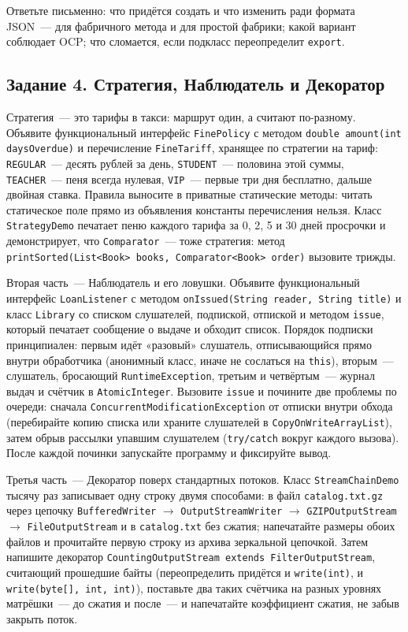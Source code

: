 Ответьте письменно: что придётся создать и что изменить ради формата JSON~---
для фабричного метода и для простой фабрики; какой вариант соблюдает OCP; что
сломается, если подкласс переопределит \texttt{export}.

\subsection*{Задание 4. Стратегия, Наблюдатель и Декоратор}

Стратегия~--- это тарифы в такси: маршрут один, а считают по-разному. Объявите
функциональный интерфейс \texttt{FinePolicy} с методом
\texttt{double amount(int daysOverdue)} и перечисление \texttt{FineTariff},
хранящее по стратегии на тариф: \texttt{REGULAR}~--- десять рублей за день,
\texttt{STUDENT}~--- половина этой суммы, \texttt{TEACHER}~--- пеня всегда
нулевая, \texttt{VIP}~--- первые три дня бесплатно, дальше двойная ставка.
Правила выносите в приватные статические методы: читать статическое поле прямо
из объявления константы перечисления нельзя. Класс \texttt{StrategyDemo} печатает
пеню каждого тарифа за 0, 2, 5 и 30 дней просрочки и демонстрирует, что
\texttt{Comparator}~--- тоже стратегия: метод
\texttt{printSorted(List<Book> books, Comparator<Book> order)} вызовите трижды.

Вторая часть~--- Наблюдатель и его ловушки. Объявите функциональный интерфейс
\texttt{LoanListener} с методом \texttt{onIssued(String reader, String title)} и
класс \texttt{Library} со списком слушателей, подпиской, отпиской и методом
\texttt{issue}, который печатает сообщение о выдаче и обходит список. Порядок
подписки принципиален: первым идёт «разовый» слушатель, отписывающийся прямо
внутри обработчика (анонимный класс, иначе не сослаться на \texttt{this}),
вторым~--- слушатель, бросающий \texttt{RuntimeException}, третьим и
четвёртым~--- журнал выдач и счётчик в \texttt{AtomicInteger}. Вызовите
\texttt{issue} и почините две проблемы по очереди: сначала
\texttt{ConcurrentModificationException} от отписки внутри обхода (перебирайте
копию списка или храните слушателей в \texttt{CopyOnWriteArrayList}), затем
обрыв рассылки упавшим слушателем (\texttt{try/catch} вокруг каждого вызова).
После каждой починки запускайте программу и фиксируйте вывод.

Третья часть~--- Декоратор поверх стандартных потоков. Класс
\texttt{StreamChainDemo} тысячу раз записывает одну строку двумя способами: в
файл \texttt{catalog.txt.gz} через цепочку \texttt{BufferedWriter} $\to$
\texttt{OutputStreamWriter} $\to$ \texttt{GZIPOutputStream} $\to$
\texttt{FileOutputStream} и в \texttt{catalog.txt} без сжатия; напечатайте
размеры обоих файлов и прочитайте первую строку из архива зеркальной цепочкой.
Затем напишите декоратор \texttt{CountingOutputStream extends
FilterOutputStream}, считающий прошедшие байты (переопределить придётся и
\texttt{write(int)}, и \texttt{write(byte[], int, int)}), поставьте два таких
счётчика на разных уровнях матрёшки~--- до сжатия и после~--- и напечатайте
коэффициент сжатия, не забыв закрыть поток.

